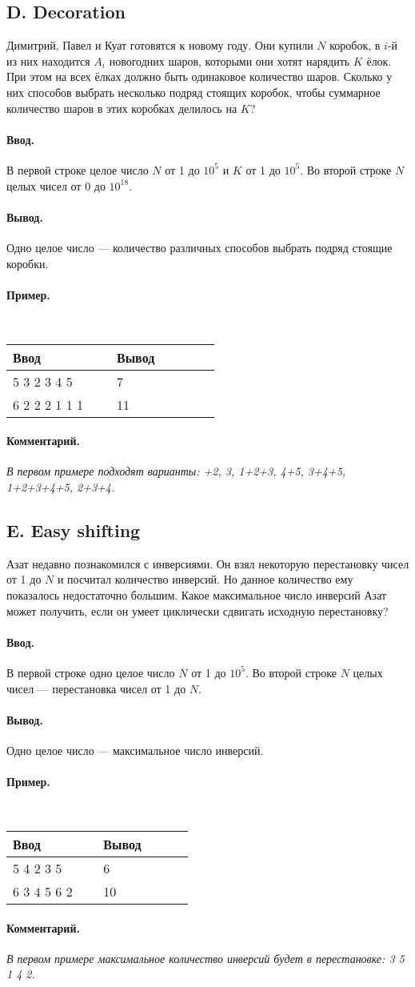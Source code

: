 \documentclass[12pt, a4paper]{article}
\newcommand{\informat}[1]
{
	\paragraph{Ввод.\\} #1
}
\newcommand{\outformat}[1]
{
	\paragraph{Вывод.\\} #1
}
\newcommand{\examplee}[4]
{
	\paragraph{Пример.\\}
	{\tt
	\begin{tabular}{|p{0.4\linewidth}|p{0.4\linewidth}|}
	\hline
	Ввод 	& Вывод  	\\
	\hline
	#1 		& #2 		\\
	\hline
	#3		& #4		\\
	\hline
	\end{tabular}
	}
}
\newcommand{\excomm}[1]
{
	\paragraph{Комментарий. \\}
	\textit{#1}
}
\begin{document}
\subsection*{D. Decoration}


Димитрий, Павел и Куат готовятся к новому году. Они купили $N$ коробок, в $i$-й из них находится $A_i$ новогодних шаров, которыми они хотят нарядить $K$ ёлок. При этом на всех ёлках должно быть одинаковое количество шаров. Сколько у них способов выбрать несколько подряд стоящих коробок, чтобы суммарное количество шаров в этих коробках делилось на $K$?

\informat{В первой строке целое число $N$ от 1 до $10^5$ и $K$ от 1 до $10^5$. \newline
Во второй строке $N$ целых чисел от 0 до $10^{18}$.}

\outformat{Одно целое число --- количество различных способов выбрать подряд стоящие коробки.}

\examplee
{5 3  2 3 4 5}
{7}
{6 2 \newline
2 2 2 1 1 1}
{11}

\excomm{В первом примере подходят варианты: \newline 1+2, 3, 1+2+3, 4+5, 3+4+5, 1+2+3+4+5, 2+3+4.}



\subsection*{E. Easy shifting}


Азат недавно познакомился с инверсиями. Он взял некоторую перестановку чисел от 1 до $N$ и посчитал количество инверсий. Но данное количество ему показалось недостаточно большим. Какое максимальное число инверсий Азат может получить, если он умеет циклически сдвигать исходную перестановку?

\informat{В первой строке одно целое число $N$ от 1 до $10^5$. \newline 
Во второй строке $N$ целых чисел --- перестановка чисел от 1 до $N$.}

\outformat{Одно целое число --- максимальное число инверсий.}

\examplee
{5 \newline
1 4 2 3 5}
{6}
{6 \newline
1 3 4 5 6 2}
{10}

\excomm{В первом примере максимальное количество инверсий будет в перестановке: 3 5 1 4 2.}
\end{document}
